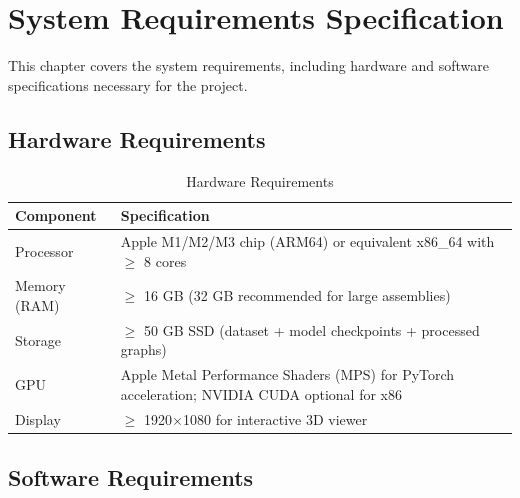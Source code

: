 \documentclass[12pt]{report}
\begin{document}
\newpage

\chapter{System Requirements Specification}

This chapter covers the system requirements, including hardware and software specifications necessary for the project.

\section{Hardware Requirements}

\begin{table}[H]
\centering
\caption{Hardware Requirements}
\begin{tabular}{p{4cm} p{8cm}}
\toprule
\textbf{Component} & \textbf{Specification} \\
\midrule
Processor & Apple M1/M2/M3 chip (ARM64) or equivalent x86\_64 with $\geq$ 8 cores \\
Memory (RAM) & $\geq$ 16 GB (32 GB recommended for large assemblies) \\
Storage & $\geq$ 50 GB SSD (dataset + model checkpoints + processed graphs) \\
GPU & Apple Metal Performance Shaders (MPS) for PyTorch acceleration; NVIDIA CUDA optional for x86 \\
Display & $\geq$ 1920$\times$1080 for interactive 3D viewer \\
\bottomrule
\end{tabular}
\end{table}

\section{Software Requirements}
\end{document}
